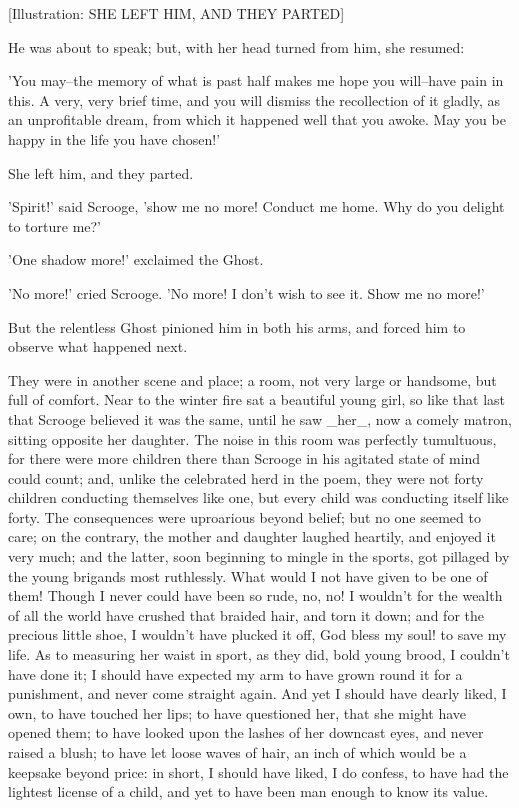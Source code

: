 [Illustration: SHE LEFT HIM, AND THEY PARTED]

He was about to speak; but, with her head turned from him, she resumed:

'You may--the memory of what is past half makes me hope you will--have
pain in this. A very, very brief time, and you will dismiss the
recollection of it gladly, as an unprofitable dream, from which it
happened well that you awoke. May you be happy in the life you have
chosen!'

She left him, and they parted.

'Spirit!' said Scrooge, 'show me no more! Conduct me home. Why do you
delight to torture me?'

'One shadow more!' exclaimed the Ghost.

'No more!' cried Scrooge. 'No more! I don't wish to see it. Show me no
more!'

But the relentless Ghost pinioned him in both his arms, and forced him
to observe what happened next.

They were in another scene and place; a room, not very large or
handsome, but full of comfort. Near to the winter fire sat a beautiful
young girl, so like that last that Scrooge believed it was the same,
until he saw _her_, now a comely matron, sitting opposite her daughter.
The noise in this room was perfectly tumultuous, for there were more
children there than Scrooge in his agitated state of mind could count;
and, unlike the celebrated herd in the poem, they were not forty
children conducting themselves like one, but every child was conducting
itself like forty. The consequences were uproarious beyond belief; but
no one seemed to care; on the contrary, the mother and daughter laughed
heartily, and enjoyed it very much; and the latter, soon beginning to
mingle in the sports, got pillaged by the young brigands most
ruthlessly. What would I not have given to be one of them! Though I
never could have been so rude, no, no! I wouldn't for the wealth of all
the world have crushed that braided hair, and torn it down; and for the
precious little shoe, I wouldn't have plucked it off, God bless my soul!
to save my life. As to measuring her waist in sport, as they did, bold
young brood, I couldn't have done it; I should have expected my arm to
have grown round it for a punishment, and never come straight again. And
yet I should have dearly liked, I own, to have touched her lips; to have
questioned her, that she might have opened them; to have looked upon the
lashes of her downcast eyes, and never raised a blush; to have let loose
waves of hair, an inch of which would be a keepsake beyond price: in
short, I should have liked, I do confess, to have had the lightest
license of a child, and yet to have been man enough to know its value.

